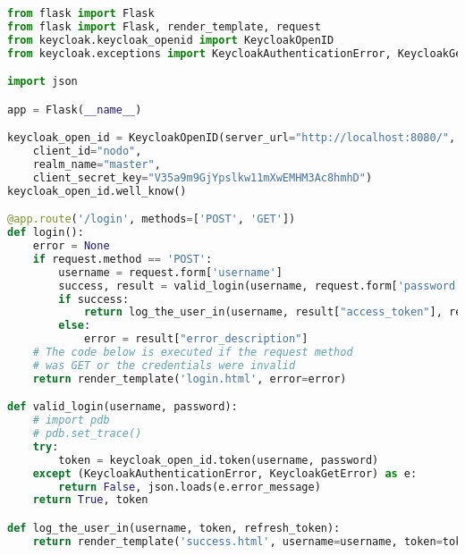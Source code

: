 \begin{lstlisting}[language=Python]
from flask import Flask
from flask import Flask, render_template, request
from keycloak.keycloak_openid import KeycloakOpenID
from keycloak.exceptions import KeycloakAuthenticationError, KeycloakGetError

import json

app = Flask(__name__)

keycloak_open_id = KeycloakOpenID(server_url="http://localhost:8080/", 
	client_id="nodo", 
	realm_name="master", 
	client_secret_key="V35a9m9GjYpslkw11mXwEMHM3Ac8hmhD")
keycloak_open_id.well_know()

@app.route('/login', methods=['POST', 'GET'])
def login():
	error = None
	if request.method == 'POST':
		username = request.form['username']
		success, result = valid_login(username, request.form['password'])
		if success:
			return log_the_user_in(username, result["access_token"], result["refresh_token"])
		else:
			error = result["error_description"]
	# The code below is executed if the request method
	# was GET or the credentials were invalid
	return render_template('login.html', error=error)

def valid_login(username, password):
	# import pdb
	# pdb.set_trace()
	try:
		token = keycloak_open_id.token(username, password)
	except (KeycloakAuthenticationError, KeycloakGetError) as e:
		return False, json.loads(e.error_message)
	return True, token

def log_the_user_in(username, token, refresh_token):
	return render_template('success.html', username=username, token=token, refresh_token=refresh_token)
\end{lstlisting}
